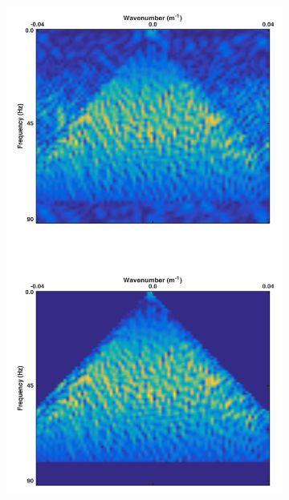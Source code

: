 \begin{figure}
\begin{subfigure}[t]{0.25\textwidth}
		\caption{}
		\label{fig:Ch-Theory-PseudoDeblendedCRG5}
	\end{subfigure}
	\centering
	\begin{subfigure}[t]{0.25\textwidth}
		\includegraphics[width=\textwidth]{Plots/Mahdad/5iter/FK-Spectra}	
		\caption{}
		\label{fig:Ch-Theory-FKDeblended-NoFilter}
	\end{subfigure}
	\begin{subfigure}[t]{0.25\textwidth}

\end{subfigure}
\end{figure}

